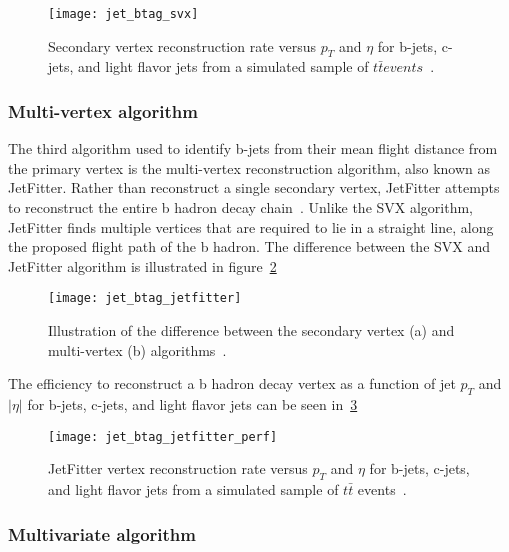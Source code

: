 \begin{figure}[!ht]
    \centering
\texttt{[image: jet\_btag\_svx]}
\caption{Secondary vertex reconstruction rate versus $p_T$ and $\eta$ for b-jets, c-jets, and light flavor jets
from a simulated sample of $t\bar{t} events$~\cite{jet-bjet-opt}.}
\label{fig:jet_btag_svx}
\end{figure}

\subsubsection{Multi-vertex algorithm}\label{subsubsec:jet_btag_jetfitter}

The third algorithm used to identify b-jets from their mean flight distance from the primary vertex is the multi-vertex reconstruction algorithm, also known as JetFitter.
Rather than reconstruct a single secondary vertex, JetFitter attempts to reconstruct the entire b hadron decay chain~\cite{jet-btag-jetfitter}.
Unlike the SVX algorithm, JetFitter finds multiple vertices that are required to lie in a straight line, along the proposed flight path of the b hadron.
The difference between the SVX and JetFitter algorithm is illustrated in figure~\ref{fig:jet_btag_jetfitter}
\begin{figure}[!ht]
    \centering
\texttt{[image: jet\_btag\_jetfitter]}
\caption{Illustration of the difference between the secondary vertex (a) and multi-vertex (b) algorithms~\cite{jet-btag-jetfitter}.}
\label{fig:jet_btag_jetfitter}
\end{figure}
The efficiency to reconstruct a b hadron decay vertex as a function of jet $p_T$ and $|\eta|$ for b-jets, c-jets, and light flavor jets can be seen in~\ref{fig:jet_btag_jetfitter_perf}
\begin{figure}[!ht]
    \centering
\texttt{[image: jet\_btag\_jetfitter\_perf]}
\caption{JetFitter vertex reconstruction rate versus $p_T$ and $\eta$ for b-jets, c-jets, and light flavor jets from a simulated sample of $t\bar{t}$ events~\cite{jet-btag-mv2}.}
\label{fig:jet_btag_jetfitter_perf}
\end{figure}

\subsubsection{Multivariate algorithm}\label{subsubsec:jet_btag_mv2}

